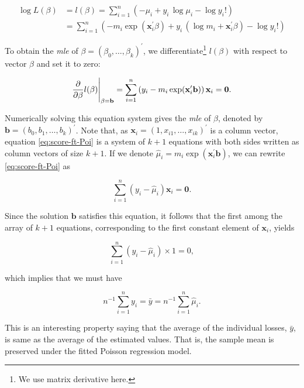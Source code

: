 \documentclass[]{book}
\let\rmarkdownfootnote\footnote%
\def\footnote{\protect\rmarkdownfootnote}
\theoremstyle{definition}
\theoremstyle{definition}
\theoremstyle{definition}
\theoremstyle{remark}
\begin{document}
\begin{align}
\nonumber \log L(\beta)    &= l(\beta)=\sum^n_{i=1} \left( -\mu_i +y_i \, \log \mu_i -\log y_i! \right)  \\
    &  = \sum^n_{i=1} \left( -m_i \exp(\mathbf{ x}^{\prime}_i\beta) +y_i \,(\log m_i+\mathbf{ x}^{\prime}_i\beta)  -\log y_i! \right)
\label{eq:ll-Poi-reg}
\end{align}

To obtain the \emph{mle} of
\(\beta=(\beta_0, \ldots, \beta_k)^{\prime}\), we
differentiate\footnote{We use matrix derivative here.} \(l(\beta)\) with
respect to vector \(\beta\) and set it to zero:

\begin{equation}
\frac{\partial}{\partial \beta}l(\beta)\Bigg{|}_{\beta=\mathbf{b}}=\sum^n_{i=1} \left(y_i -m_i \exp(\mathbf{ x}^{\prime}_i \mathbf{ b}) \right)\mathbf{ x}_i=\mathbf{ 0}.
\label{eq:score-ft-Poi}
\end{equation}

Numerically solving this equation system gives the \emph{mle} of
\(\beta\), denoted by \(\mathbf{ b}=(b_0, b_1, \ldots, b_k)^{\prime}\).
Note that, as \(\mathbf{ x}_i=(1, x_{i1}, \ldots, x_{ik})^{\prime}\) is
a column vector, equation \eqref{eq:score-ft-Poi} is a system of \(k+1\)
equations with both sides written as column vectors of size \(k+1\). If
we denote \(\hat{\mu}_i=m_i \exp(\mathbf{ x}^{\prime}_i \mathbf{ b})\),
we can rewrite \eqref{eq:score-ft-Poi} as

\begin{equation}
\sum^n_{i=1} \left(y_i -\hat{\mu}_i \right)\mathbf{ x}_i=\mathbf{ 0}.
\end{equation}

Since the solution \(\mathbf{ b}\) satisfies this equation, it follows
that the first among the array of \(k+1\) equations, corresponding to
the first constant element of \(\mathbf{ x}_i\), yields

\begin{equation}
\sum^n_{i=1}\left( y_i -\hat{\mu}_i \right)\times 1={ 0},
\end{equation}

which implies that we must have

\begin{equation}
n^{-1}\sum_{i=1}^n y_i =\bar{y}=n^{-1}\sum_{i=1}^n \hat{\mu}_i.
\end{equation}

This is an interesting property saying that the average of the
individual losses, \(\bar{y}\), is same as the average of the estimated
values. That is, the sample mean is preserved under the fitted Poisson
regression model.
\end{document}
